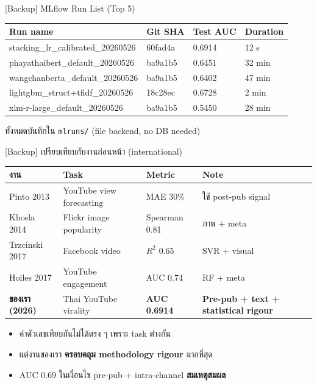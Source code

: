 \documentclass[aspectratio=169,11pt,xcolor=dvipsnames]{beamer}
\newcommand{\hl}[1]{\textcolor{kmitlOrange}{\textbf{#1}}}
\begin{document}
\begin{frame}{[Backup] MLflow Run List (Top 5)}
  \footnotesize
  \begin{tabular}{p{4.5cm}p{2.2cm}p{1.4cm}p{1.4cm}}
    \toprule
    \textbf{Run name} & \textbf{Git SHA} & \textbf{Test AUC} & \textbf{Duration}\\
    \midrule
    stacking\_lr\_calibrated\_20260526 & 60fad4a & 0.6914 & 12 s\\
    phayathaibert\_default\_20260526   & ba9a1b5 & 0.6451 & 32 min\\
    wangchanberta\_default\_20260526   & ba9a1b5 & 0.6402 & 47 min\\
    lightgbm\_struct+tfidf\_20260526   & 18c28ec & 0.6728 & 2 min\\
    xlm-r-large\_default\_20260526     & ba9a1b5 & 0.5450 & 28 min\\
    \bottomrule
  \end{tabular}
  \vspace{0.6em}
  \begin{center}
    \scriptsize ทั้งหมดบันทึกใน \texttt{mlruns/} (file backend, no DB needed)
  \end{center}
\end{frame}

\begin{frame}{[Backup] เปรียบเทียบกับงานก่อนหน้า (international)}
  \footnotesize
  \begin{tabular}{p{3cm}p{3cm}p{1.5cm}p{4cm}}
    \toprule
    \textbf{งาน} & \textbf{Task} & \textbf{Metric} & \textbf{Note}\\
    \midrule
    Pinto 2013 & YouTube view forecasting & MAE 30\% & ใช้ post-pub signal\\
    Khosla 2014 & Flickr image popularity & Spearman 0.81 & ภาพ + meta\\
    Trzcinski 2017 & Facebook video & $R^2$ 0.65 & SVR + visual\\
    Hoiles 2017 & YouTube engagement & AUC 0.74 & RF + meta\\
    \midrule
    \hl{ของเรา (2026)} & Thai YouTube virality & \hl{AUC 0.6914} & \hl{Pre-pub + text + statistical rigour}\\
    \bottomrule
  \end{tabular}
  \vspace{0.6em}
  \begin{itemize}
    \item ค่าตัวเลขเทียบกันไม่ได้ตรง ๆ เพราะ task ต่างกัน
    \item แต่งานของเรา \hl{ครอบคลุม methodology rigour} มากที่สุด
    \item AUC 0.69 ในเงื่อนไข pre-pub + intra-channel \hl{สมเหตุสมผล}
  \end{itemize}
\end{frame}
\end{document}
